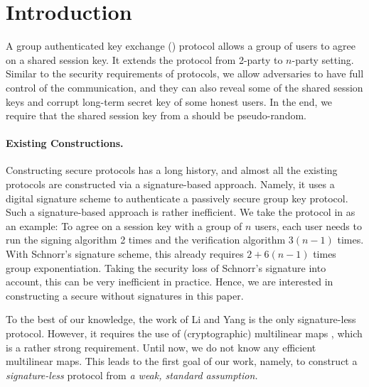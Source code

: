 \newcommand{\introGAKE}{\text{GAKE}\xspace}
\newcommand{\introAKE}{\text{AKE}\xspace}
\newcommand{\introNumSess}{s}
\newcommand{\introNumUser}{n}


\section{Introduction}\label{sec:introduction}

A group authenticated key exchange (\introGAKE) protocol allows a group of users to agree on a shared session key. It extends the \introAKE protocol from 2-party to $n$-party setting. Similar to the security requirements of \introAKE protocols, we allow adversaries to have full control of the communication, and they can also reveal some of the shared session keys and corrupt long-term secret key of some honest users. 
In the end, we require that the shared session key from a \introGAKE should be pseudo-random.

\paragraph{Existing Constructions.}
Constructing secure \introGAKE protocols has a long history, and almost all the existing protocols \cite{CCS:BCPQ01,AC:BreChePoi01,EC:BreChePoi02,PQCRYPTO:ADGK19,JC:PanQiaRin22} are constructed via a signature-based approach. Namely, it uses a digital signature scheme to authenticate a passively secure group key protocol. Such a signature-based approach is rather inefficient. We take the protocol in \cite{JC:PanQiaRin22} as an example: To agree on a session key with a group of $n$ users, each user needs to run the signing algorithm 2 times and the verification algorithm $3(n-1)$ times. With Schnorr's signature scheme, this already requires $2+6(n-1)$ times group exponentiation. Taking the security loss of Schnorr's signature into account, this can be very inefficient in practice. Hence, we are interested in constructing a secure \introGAKE without signatures in this paper.

To the best of our knowledge, the work of Li and Yang \cite{CANS:LiYan13} is the only signature-less \introGAKE protocol. However, it requires the use of (cryptographic) multilinear maps \cite{EC:GarGenHal13}, which is a rather strong requirement. Until now, we do not know any efficient multilinear maps. This leads to the first goal of our work, namely, to construct a \textit{signature-less} \introGAKE protocol from \textit{a weak, standard assumption.}

